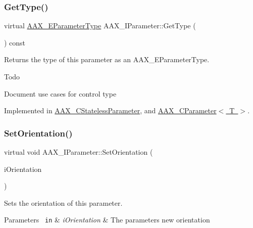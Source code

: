 \subsubsection{\texorpdfstring{GetType()}{GetType()}}
{\footnotesize\ttfamily virtual \mbox{\hyperlink{a00491_a4cd0f189daa9a60cf36883c56344bb2e}{A\+A\+X\+\_\+\+E\+Parameter\+Type}} A\+A\+X\+\_\+\+I\+Parameter\+::\+Get\+Type (\begin{DoxyParamCaption}{ }\end{DoxyParamCaption}) const\hspace{0.3cm}{\ttfamily [pure virtual]}}



Returns the type of this parameter as an A\+A\+X\+\_\+\+E\+Parameter\+Type. 

\begin{DoxyRefDesc}{Todo}
\item[\mbox{\hyperlink{a00785__todo000049}{Todo}}]Document use cases for control type \end{DoxyRefDesc}


Implemented in \mbox{\hyperlink{a01541_a47efcdd3c7c5672fff2f9fbcc50230df}{A\+A\+X\+\_\+\+C\+Stateless\+Parameter}}, and \mbox{\hyperlink{a01537_a0a7163ae07746260e3f6be4a6c974e4c}{A\+A\+X\+\_\+\+C\+Parameter$<$ T $>$}}.

\mbox{\label{a01857_ac8ba9ed15da3c235ef9844177e1cf6d0}} 
\subsubsection{\texorpdfstring{SetOrientation()}{SetOrientation()}}
{\footnotesize\ttfamily virtual void A\+A\+X\+\_\+\+I\+Parameter\+::\+Set\+Orientation (\begin{DoxyParamCaption}\item[{\mbox{\hyperlink{a00491_a52f91d1c14aa5dceedabfb9d2de31bf0}{A\+A\+X\+\_\+\+E\+Parameter\+Orientation}}}]{i\+Orientation }\end{DoxyParamCaption})\hspace{0.3cm}{\ttfamily [pure virtual]}}



Sets the orientation of this parameter. 


\begin{DoxyParams}[1]{Parameters}
\mbox{\texttt{ in}}  & {\em i\+Orientation} & The parameter\textquotesingle{}s new orientation \\
\hline
\end{DoxyParams}


